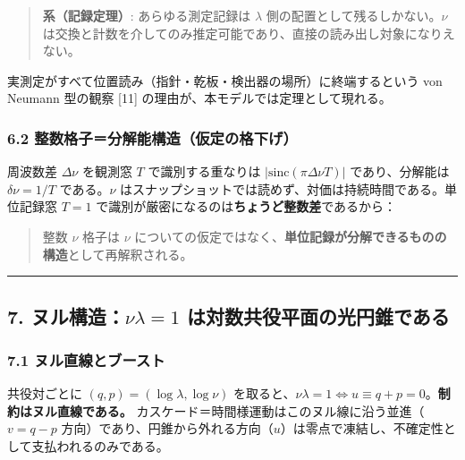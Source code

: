 \documentclass[
]{ltjsarticle}
\begin{document}
\begin{quote}
\textbf{系（記録定理）}: あらゆる測定記録は \(\lambda\)
側の配置として残るしかない。\(\nu\)
は交換と計数を介してのみ推定可能であり、直接の読み出し対象になりえない。
\end{quote}

実測定がすべて位置読み（指針・乾板・検出器の場所）に終端するという von
Neumann 型の観察 {[}11{]} の理由が、本モデルでは定理として現れる。

\subsubsection{6.2
整数格子＝分解能構造（仮定の格下げ）}\label{ux6574ux6570ux683cux5b50ux5206ux89e3ux80fdux69cbux9020ux4eeeux5b9aux306eux683cux4e0bux3052}

周波数差 \(\Delta\nu\) を観測窓 \(T\) で識別する重なりは
\(|\mathrm{sinc}(\pi\Delta\nu T)|\) であり、分解能は \(\delta\nu=1/T\)
である。\(\nu\)
はスナップショットでは読めず、対価は持続時間である。単位記録窓 \(T=1\)
で識別が厳密になるのは\textbf{ちょうど整数差}であるから：

\begin{quote}
整数 \(\nu\) 格子は \(\nu\)
についての仮定ではなく、\textbf{単位記録が分解できるものの構造}として再解釈される。
\end{quote}

\begin{center}\rule{0.5\linewidth}{0.5pt}\end{center}

\subsection{\texorpdfstring{7. ヌル構造：\(\nu\lambda=1\)
は対数共役平面の光円錐である}{7. ヌル構造：\textbackslash nu\textbackslash lambda=1 は対数共役平面の光円錐である}}\label{ux30ccux30ebux69cbux9020nulambda1-ux306fux5bfeux6570ux5171ux5f79ux5e73ux9762ux306eux5149ux5186ux9310ux3067ux3042ux308b}

\subsubsection{7.1
ヌル直線とブースト}\label{ux30ccux30ebux76f4ux7ddaux3068ux30d6ux30fcux30b9ux30c8}

共役対ごとに \((q,p)=(\log\lambda,\log\nu)\)
を取ると、\(\nu\lambda=1\iff u\equiv q+p=0\)。\textbf{制約はヌル直線である。}
カスケード＝時間様運動はこのヌル線に沿う並進（\(v=q-p\)
方向）であり、円錐から外れる方向（\(u\)）は零点で凍結し、不確定性として支払われるのみである。
\end{document}
